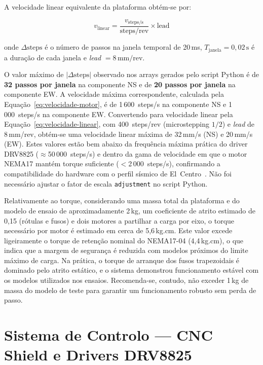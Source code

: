 A velocidade linear equivalente da plataforma obtém-se por:

\begin{equation}
v_{\text{linear}} = \frac{v_{\text{steps/s}}}{\text{steps/rev}} \times \text{lead}
\label{eq:velocidade-linear}
\end{equation}

onde $\Delta\text{steps}$ é o número de passos na janela temporal de 20\,ms, $T_{\text{janela}} = 0{,}02\,\text{s}$ é a duração de cada janela e \textit{lead} $= 8\,\text{mm/rev}$.

O valor máximo de $|\Delta\text{steps}|$ observado nos arrays gerados pelo script Python é de \textbf{32 passos por janela} na componente NS e de \textbf{20 passos por janela} na componente EW. A velocidade máxima correspondente, calculada pela Equação~\ref{eq:velocidade-motor}, é de 1\,600~steps/s na componente NS e 1\,000~steps/s na componente EW. Convertendo para velocidade linear pela Equação~\ref{eq:velocidade-linear}, com 400~steps/rev (microstepping $1/2$) e \textit{lead} de 8\,mm/rev, obtém-se uma velocidade linear máxima de 32\,mm/s (NS) e 20\,mm/s (EW). Estes valores estão bem abaixo da frequência máxima prática do driver DRV8825 ($\approx$50\,000~steps/s) e dentro da gama de velocidade em que o motor NEMA17 mantém torque suficiente ($<$2\,000~steps/s), confirmando a compatibilidade do hardware com o perfil sísmico de El~Centro~\cite{ElCentro1940}. Não foi necessário ajustar o fator de escala \texttt{adjustment} no script Python.

Relativamente ao torque, considerando uma massa total da plataforma e do modelo de ensaio de aproximadamente 2\,kg, um coeficiente de atrito estimado de 0,15 (rótulas e fusos) e dois motores a partilhar a carga por eixo, o torque necessário por motor é estimado em cerca de 5,6\,kg.cm. Este valor excede ligeiramente o torque de retenção nominal do NEMA17-04 (4,4\,kg.cm), o que indica que a margem de segurança é reduzida com modelos próximos do limite máximo de carga. Na prática, o torque de arranque dos fusos trapezoidais é dominado pelo atrito estático, e o sistema demonstrou funcionamento estável com os modelos utilizados nos ensaios. Recomenda-se, contudo, não exceder 1\,kg de massa do modelo de teste para garantir um funcionamento robusto sem perda de passo.


\section{Sistema de Controlo --- CNC Shield e Drivers DRV8825}
\label{sec:sistema-controlo}

